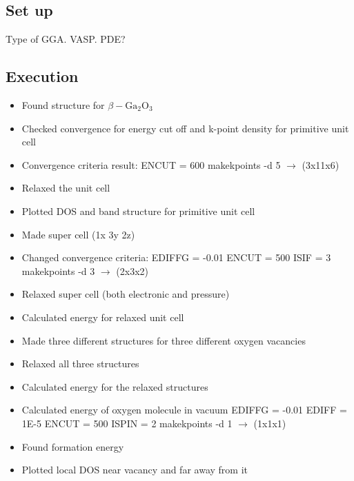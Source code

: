 \subsection{Set up}

Type of GGA.
VASP. PDE?


\subsection{Execution}

\begin{itemize}

\item Found structure for $\beta- \text{Ga}_2\text{O}_3$

\item Checked convergence for energy cut off and k-point density for primitive unit cell

\item Convergence criteria result:
\subitem ENCUT = 600
\subitem makekpoints -d 5 $\rightarrow$ (3x11x6)

\item Relaxed the unit cell

\item Plotted DOS and band structure for primitive unit cell

\item Made super cell (1x 3y 2z)

\item Changed convergence criteria:
\subitem EDIFFG = -0.01
\subitem ENCUT = 500
\subitem ISIF = 3
\subitem makekpoints -d 3 $\rightarrow$ (2x3x2)

\item Relaxed super cell (both electronic and pressure)

\item Calculated energy for relaxed unit cell

\item Made three different structures for three different oxygen vacancies

\item Relaxed all three structures

\item Calculated energy for the relaxed structures

\item Calculated energy of oxygen molecule in vacuum
\subitem EDIFFG = -0.01
\subitem EDIFF = 1E-5
\subitem ENCUT = 500
\subitem ISPIN = 2
\subitem makekpoints -d 1 $\rightarrow$ (1x1x1)

\item Found formation energy 

\item Plotted local DOS near vacancy and far away from it

\end{itemize}

